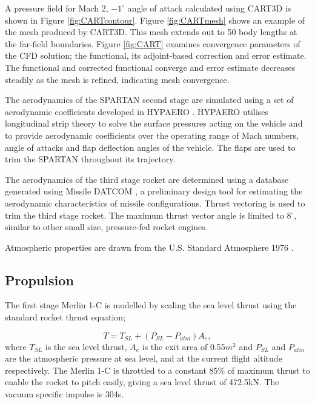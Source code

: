 \documentclass[]{aiaa-tc}
\begin{document}
A pressure field for Mach 2, $-1^\circ$ angle of attack calculated using CART3D is shown in Figure \ref{fig:CARTcontour}. Figure \ref{fig:CARTmesh} shows an example of the mesh produced by CART3D. This mesh extends out to 50 body lengths at the far-field boundaries. Figure \ref{fig:CART} examines convergence parameters of the CFD solution; the functional, its adjoint-based correction and error estimate. The functional and corrected functional converge and error estimate decreases steadily as the mesh is refined, indicating mesh convergence.

The aerodynamics of the SPARTAN second stage are simulated using a set of aerodynamic coefficients developed in HYPAERO \cite{Jazra2009,Preller2017}. HYPAERO utilises longitudinal strip theory to solve the surface pressures acting on the vehicle and to provide aerodynamic coefficients over the operating range of Mach numbers, angle of attacks and flap deflection angles of the vehicle. The flaps are used to trim the SPARTAN throughout its trajectory. 

The aerodynamics of the third stage rocket are determined using a database generated using Missile DATCOM \cite{Blake1998}, a preliminary design tool for estimating the aerodynamic characteristics of missile configurations. Thrust vectoring is used to trim the third stage rocket. The maximum thrust vector angle is limited to 8$^\circ$, similar to other small size, pressure-fed rocket engines\cite{Zandbergen}. 

Atmospheric properties are drawn from the U.S. Standard Atmosphere 1976 \cite{Administration1976}.  
\subsection{Propulsion}
The first stage Merlin 1-C is modelled by scaling the sea level thrust using the standard rocket thrust equation;

\begin{equation}
T = T_{SL} + (P_{SL}-P_{atm}) A_e,
\end{equation}
where $T_{SL}$ is the sea level thrust, $A_e$ is the exit area of 0.55$m^2$ and $P_{SL}$ and $P_{atm}$ are the atmospheric pressure at sea level, and at the current flight altitude respectively. The Merlin 1-C is throttled to a constant 85\% of maximum thrust to enable the rocket to pitch easily, giving a sea level thrust of 472.5kN\cite{Vehicle2008}. The vacuum specific impulse is 304s\cite{Vehicle2008}.
\end{document}
